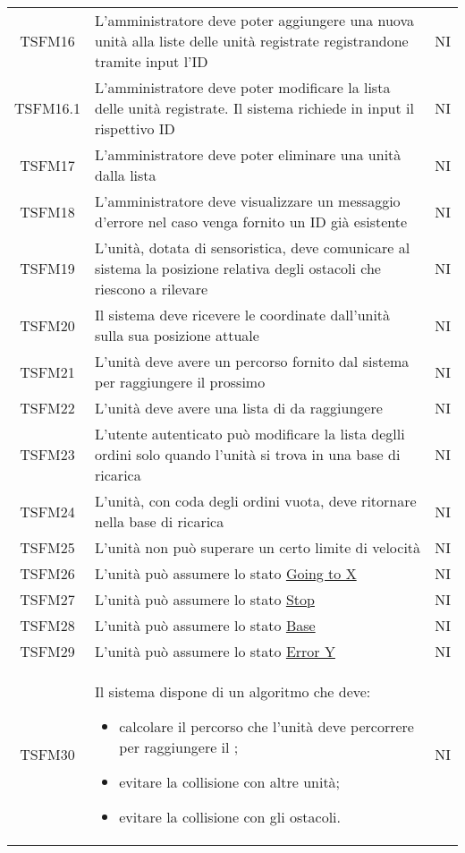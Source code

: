 \begin{longtable}[h!] { c  m{12cm} c}
		TSFM16 & L'amministratore deve poter aggiungere una nuova unità alla liste delle unità registrate registrandone tramite input l'ID & NI\\

		TSFM16.1 & 	L'amministratore deve poter modificare la lista delle unità registrate. Il sistema richiede in input il rispettivo ID & NI\\

		TSFM17 & L'amministratore deve poter eliminare una unità dalla lista & NI\\

		TSFM18  & L'amministratore deve visualizzare un messaggio d'errore nel caso venga fornito un ID già esistente & NI \\

		TSFM19   & L'unità, dotata di sensoristica, deve comunicare al sistema la posizione relativa degli ostacoli che riescono a rilevare & NI \\

		TSFM20 & Il sistema deve ricevere le coordinate dall'unità sulla sua posizione attuale & NI \\

		TSFM21 & L'unità deve avere un percorso fornito dal sistema per raggiungere il prossimo \glock{POI} & NI \\

		TSFM22 & L'unità deve avere una lista di \glock{POI} da raggiungere & NI \\

		TSFM23  & L'utente autenticato può modificare la lista deglli ordini solo quando l'unità si trova in una base di ricarica & NI \\

		TSFM24  & L'unità, con coda degli ordini vuota, deve ritornare nella base di ricarica & NI \\

		TSFM25  & L'unità non può superare un certo limite di velocità & NI \\

		TSFM26 & L'unità può assumere lo stato \underline{Going to X} & NI \\
		TSFM27 & L'unità può assumere lo stato \underline{Stop} & NI \\
		TSFM28 & L'unità può assumere lo stato \underline{Base} & NI \\
		TSFM29 & L'unità può assumere lo stato \underline{Error Y} & NI \\
		TSFM30  & Il sistema dispone di un algoritmo che deve:
				\begin{itemize}
					\item calcolare il percorso che l'unità deve percorrere per raggiungere il \glock{POI};
					\item evitare la collisione con altre unità;
					\item evitare la collisione con gli ostacoli.
				\end{itemize}
										& NI \\


\end{longtable}
